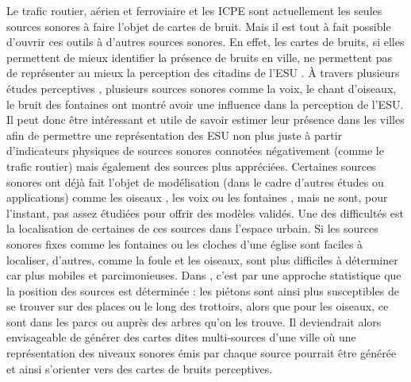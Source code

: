 Le trafic routier, aérien et ferroviaire et les ICPE sont actuellement les seules sources sonores à faire l'objet de cartes de bruit. Mais il est tout à fait possible d'ouvrir ces outils à d'autres sources sonores.
En effet, les cartes de bruits, si elles permettent de mieux identifier la présence de bruits en ville, ne permettent pas de représenter au mieux la perception des citadins de l'ESU \cite{brown2012review}. À travers plusieurs études perceptives \cite{lavandier2006contribution,hong2013designing}, plusieurs sources sonores comme la voix, le chant d'oiseaux, le bruit des fontaines ont montré avoir une influence dans la perception de l'ESU.
Il peut donc être intéressant et utile de savoir estimer leur présence dans les villes afin de permettre une représentation des ESU non plus juste à partir d'indicateurs physiques de sources sonores connotées négativement (comme le trafic routier) mais également des sources plus appréciées.
Certaines sources sonores ont déjà fait l'objet de modélisation (dans le cadre d'autres études ou applications) comme les oiseaux \cite{nemeth2013bird}, les voix \cite{hayne2011prediction} ou les fontaines \cite{watts2009measurement}, mais ne sont, pour l'instant, pas assez étudiées pour offrir des modèles validés.
Une des difficultés est la localisation de certaines de ces sources dans l'espace urbain. Si les sources sonores fixes comme les fontaines ou les cloches d'une église sont faciles à localiser, d'autres, comme la foule et les oiseaux, sont plus difficiles à déterminer car plus mobiles et parcimonieuses. Dans \cite{aumond2018probabilistic}, c'est par une approche statistique que la position des sources est déterminée : les piétons sont ainsi plus susceptibles de se trouver sur des places ou le long des trottoirs, alors que pour les oiseaux, ce sont dans les parcs ou auprès des arbres qu'on les trouve. Il deviendrait alors envisageable de générer des cartes dites multi-sources d'une ville où une représentation des niveaux sonores émis par chaque source pourrait être générée et ainsi s'orienter vers des cartes de bruits perceptives.



